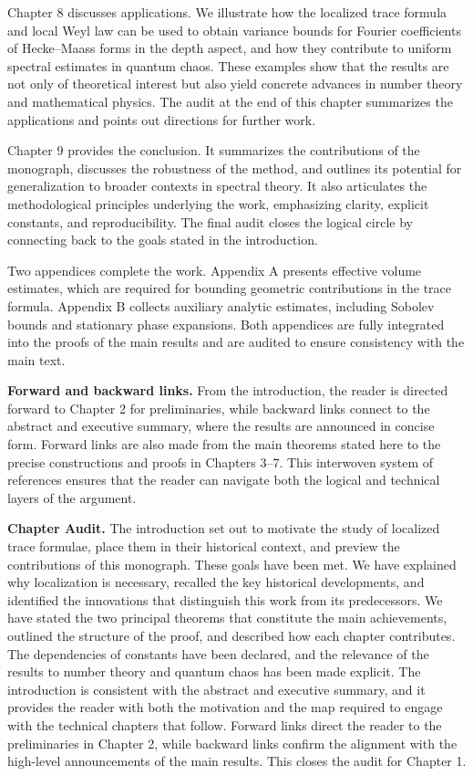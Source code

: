 Chapter 8 discusses applications. We illustrate how the localized trace formula
and local Weyl law can be used to obtain variance bounds for Fourier
coefficients of Hecke–Maass forms in the depth aspect, and how they contribute
to uniform spectral estimates in quantum chaos. These examples show that the
results are not only of theoretical interest but also yield concrete advances
in number theory and mathematical physics. The audit at the end of this chapter
summarizes the applications and points out directions for further work.

Chapter 9 provides the conclusion. It summarizes the contributions of the
monograph, discusses the robustness of the method, and outlines its potential
for generalization to broader contexts in spectral theory. It also articulates
the methodological principles underlying the work, emphasizing clarity,
explicit constants, and reproducibility. The final audit closes the logical
circle by connecting back to the goals stated in the introduction.

Two appendices complete the work. Appendix A presents effective volume
estimates, which are required for bounding geometric contributions in the trace
formula. Appendix B collects auxiliary analytic estimates, including Sobolev
bounds and stationary phase expansions. Both appendices are fully integrated
into the proofs of the main results and are audited to ensure consistency with
the main text.

\medskip

\noindent \textbf{Forward and backward links.}
From the introduction, the reader is directed forward to Chapter 2 for
preliminaries, while backward links connect to the abstract and executive
summary, where the results are announced in concise form. Forward links are
also made from the main theorems stated here to the precise constructions and
proofs in Chapters 3–7. This interwoven system of references ensures that the
reader can navigate both the logical and technical layers of the argument.

\medskip

\noindent \textbf{Chapter Audit.}
The introduction set out to motivate the study of localized trace formulae,
place them in their historical context, and preview the contributions of this
monograph. These goals have been met. We have explained why localization is
necessary, recalled the key historical developments, and identified the
innovations that distinguish this work from its predecessors. We have stated
the two principal theorems that constitute the main achievements, outlined the
structure of the proof, and described how each chapter contributes. The
dependencies of constants have been declared, and the relevance of the results
to number theory and quantum chaos has been made explicit. The introduction is
consistent with the abstract and executive summary, and it provides the reader
with both the motivation and the map required to engage with the technical
chapters that follow. Forward links direct the reader to the preliminaries in
Chapter 2, while backward links confirm the alignment with the high-level
announcements of the main results. This closes the audit for Chapter 1.
